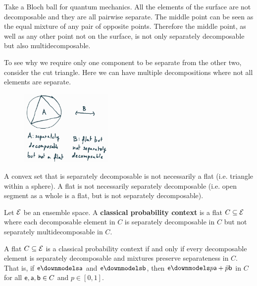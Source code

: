 \begin{mathSection}
\begin{remark}
	Take a Bloch ball for quantum mechanics. All the elements of the surface are not decomposable and they are all pairwise separate. The middle point can be seen as the equal mixture of any pair of opposite points. Therefore the middle point, as well as any other point not on the surface, is not only separately decomposable but also multidecomposable.
	
	To see why we require only one component to be separate from the other two, consider the cut triangle. Here we can have multiple decompositions where not all elements are separate.
\end{remark}

\begin{figure}[H]
	\centering
	\includegraphics[width=0.4\textwidth]{tempimages/SeparableButNotFlat.jpg}
\end{figure}

\begin{remark}
	A convex set that is separately decomposable is not necessarily a flat (i.e. triangle within a sphere). A flat is not necessarily separately decomposable (i.e. open segment as a whole is a flat, but is not separately decomposable).
\end{remark}

\begin{defn}
	Let $\Ens$ be an ensemble space. A \textbf{classical probability context} is a flat $C \subseteq \Ens$ where each decomposable element in $C$ is separately decomposable in $C$ but not separately multidecomposable in $C$.
\end{defn}

\begin{conj}
	A flat $C \subseteq \Ens$ is a classical probability context if and only if every decomposable element is separately decomposable and mixtures preserve separateness in $C$. That is, if $\ens \separate \ens[a]$ and $\ens \separate \ens[b]$, then $\ens \separate p\ens[a] + \bar{p} \ens[b]$ in $C$ for all $\ens, \ens[a], \ens[b] \in C$ and $p \in [0,1]$.
\end{conj}


\end{mathSection}
